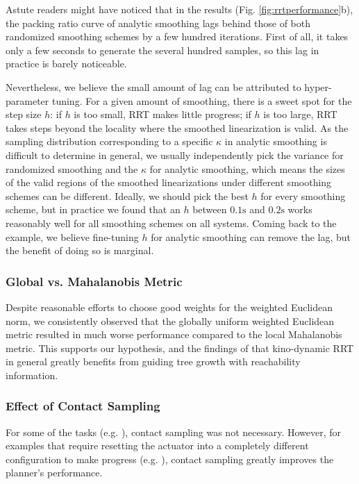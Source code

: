 Astute readers might have noticed that in the  results (Fig. \ref{fig:rrtperformance}b), the packing ratio curve of analytic smoothing lags behind those of both randomized smoothing schemes by a few hundred iterations. First of all, it takes only a few seconds to generate the several hundred samples, so this lag in practice is barely noticeable. 

Nevertheless, we believe the small amount of lag can be attributed to hyper-parameter tuning. For a given amount of smoothing, there is a sweet spot for the step size $h$: if $h$ is too small, RRT makes little progress; if $h$ is too large, RRT takes steps beyond the locality where the smoothed linearization is valid. As the sampling distribution corresponding to a specific $\kappa$ in analytic smoothing is difficult to determine in general,  we usually independently pick the variance for randomized smoothing and the $\kappa$ for analytic smoothing, which means the sizes of the valid regions of the smoothed linearizations under different smoothing schemes can be different. Ideally, we should pick the best $h$ for every smoothing scheme, but in practice we found that an $h$ between $0.1\mathrm{s}$ and $0.2\mathrm{s}$ works reasonably well for all smoothing schemes on all systems. Coming back to the  example, we believe fine-tuning $h$ for analytic smoothing can remove the lag, but the benefit of doing so is marginal. 

\subsubsection{Global vs. Mahalanobis Metric} Despite reasonable efforts to choose good weights for the weighted Euclidean norm, we consistently observed that the globally uniform weighted Euclidean metric resulted in much worse performance compared to the local Mahalanobis metric. This supports our hypothesis, and the findings of \cite{shkolnik2009reachability} that kino-dynamic RRT in general greatly benefits from guiding tree growth with reachability information. 

\subsubsection{Effect of Contact Sampling} For some of the tasks (e.g. ), contact sampling was not necessary. However, for examples that require resetting the actuator into a completely different configuration to make progress (e.g. ), contact sampling greatly improves the planner's performance. 



